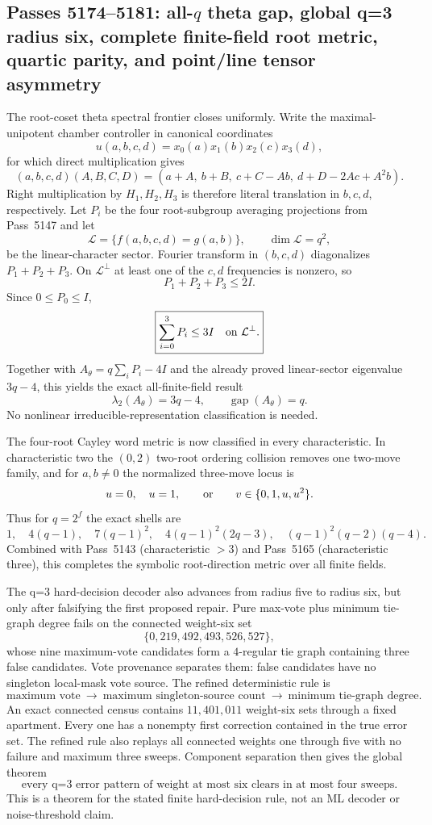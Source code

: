 \ifdefined\WPassFiveOneSevenFourLoaded\else
\gdef\WPassFiveOneSevenFourLoaded{1}
\subsection*{Passes 5174--5181: all-$q$ theta gap, global q=3 radius six, complete finite-field root metric, quartic parity, and point/line tensor asymmetry}

The root-coset theta spectral frontier closes uniformly.  Write the maximal-unipotent chamber controller in canonical coordinates
\[
 u(a,b,c,d)=x_0(a)x_1(b)x_2(c)x_3(d),
\]
for which direct multiplication gives
\[
 (a,b,c,d)(A,B,C,D)=(a+A,\ b+B,\ c+C-Ab,\ d+D-2Ac+A^2b).
\]
Right multiplication by $H_1,H_2,H_3$ is therefore literal translation in $b,c,d$, respectively.  Let $P_i$ be the four root-subgroup averaging projections from Pass~5147 and let
\[
 \mathcal L=\{f(a,b,c,d)=g(a,b)\},\qquad \dim\mathcal L=q^2,
\]
be the linear-character sector.  Fourier transform in $(b,c,d)$ diagonalizes $P_1+P_2+P_3$.  On $\mathcal L^\perp$ at least one of the $c,d$ frequencies is nonzero, so
\[
 P_1+P_2+P_3\le2I.
\]
Since $0\le P_0\le I$,
\[
 \boxed{\sum_{i=0}^{3}P_i\le3I\quad\hbox{on }\mathcal L^\perp.}
\]
Together with $A_\theta=q\sum_iP_i-4I$ and the already proved linear-sector eigenvalue $3q-4$, this yields the exact all-finite-field result
\[
 \boxed{\lambda_2(A_\theta)=3q-4,\qquad \operatorname{gap}(A_\theta)=q.}
\]
No nonlinear irreducible-representation classification is needed.

The four-root Cayley word metric is now classified in every characteristic.  In characteristic two the $(0,2)$ two-root ordering collision removes one two-move family, and for $a,b\ne0$ the normalized three-move locus is
\[
 u=0,\quad u=1,\qquad\hbox{or}\qquad v\in\{0,1,u,u^2\}.
\]
Thus for $q=2^f$ the exact shells are
\[
 \boxed{1,\quad4(q-1),\quad7(q-1)^2,\quad4(q-1)^2(2q-3),\quad(q-1)^2(q-2)(q-4).}
\]
Combined with Pass~5143 (characteristic $>3$) and Pass~5165 (characteristic three), this completes the symbolic root-direction metric over all finite fields.

The q=3 hard-decision decoder also advances from radius five to radius six, but only after falsifying the first proposed repair.  Pure max-vote plus minimum tie-graph degree fails on the connected weight-six set
\[
 \{0,219,492,493,526,527\},
\]
whose nine maximum-vote candidates form a $4$-regular tie graph containing three false candidates.  Vote provenance separates them: false candidates have no singleton local-mask vote source.  The refined deterministic rule is
\[
 \text{maximum vote}\ \longrightarrow\ \text{maximum singleton-source count}\ \longrightarrow\ \text{minimum tie-graph degree}.
\]
An exact connected census contains $11{,}401{,}011$ weight-six sets through a fixed apartment.  Every one has a nonempty first correction contained in the true error set.  The refined rule also replays all connected weights one through five with no failure and maximum three sweeps.  Component separation then gives the global theorem
\[
 \boxed{\text{every q=3 error pattern of weight at most six clears in at most four sweeps}.}
\]
This is a theorem for the stated finite hard-decision rule, not an ML decoder or noise-threshold claim.

